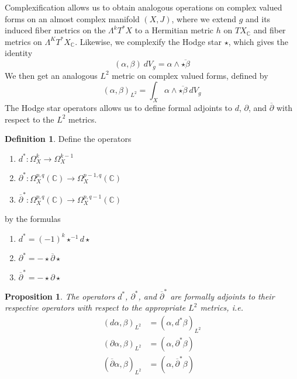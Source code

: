 \documentclass[psamsfonts, 12pt]{amsart}
\newtheorem{prop}[thm]{Proposition}
\theoremstyle{definition}
\newtheorem{defn}[thm]{Definition}
\theoremstyle{remark}
\newcommand{\C}{\mathbb{C}}
\newcommand{\dbar}{\overline{\partial}}
\newcommand{\inv}{^{-1}}
\begin{document}
Complexification allows us to obtain analogous operations on complex valued
forms on an almost complex manifold $(X,J)$, where we extend $g$ and its induced fiber
metrics on the $\Lambda^kT^*X$ to a Hermitian metric $h$ on $TX_\C$ and fiber metrics
on $\Lambda^KT^*X_\C$. Likewise, we complexify the Hodge star $\star$, which gives the
identity
\[
(\alpha,\beta)~dV_g = \alpha \wedge \overline{\star\beta}
\]
We then get an analogous $L^2$ metric on complex valued forms, defined by
\[
(\alpha,\beta)_{L^2} = \int_X \alpha \wedge \overline{\star\beta} ~dV_g
\]
The Hodge star operators allows us to define formal adjoints to $d$, $\partial$, and
$\dbar$ with respect to the $L^2$ metrics.
%
\begin{defn}
Define the operators
\begin{enumerate}
  \item $d^*: \Omega_X^k \to \Omega_X^{k-1}$
  \item $\partial^* : \Omega_X^{p,q}(\C) \to \Omega_X^{p-1,q}(\C)$
  \item $\dbar^* : \Omega_X^{p,q}(\C) \to \Omega_X^{p,q-1}(\C)$
\end{enumerate}
by the formulas
\begin{enumerate}
  \item $d^* = (-1)^k\star\inv d\star$
  \item $\partial^* = -\star\dbar\star$
  \item $\dbar^* = -\star\partial\star$
\end{enumerate}
\end{defn}
%
\begin{prop}
The operators $d^*$, $\partial^*$, and $\dbar^*$ are formally adjoints to their
respective operators with respect to the appropriate $L^2$ metrics, i.e.
\begin{align*}
(d\alpha,\beta)_{L^2} &= (\alpha, d^*\beta)_{L^2} \\
(\partial\alpha,\beta)_{L^2} &= (\alpha,\partial^*\beta) \\
(\dbar\alpha,\beta)_{L^2} &= (\alpha, \dbar^*\beta)
\end{align*}
\end{prop}
%
\end{document}
